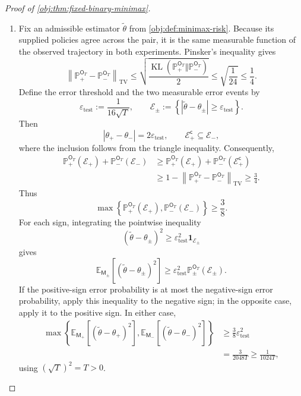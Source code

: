 \begin{proof}[Proof of \cref{obj:thm:fixed-binary-minimax}]
\begin{enumerate}
\item Fix an admissible estimator \(\widetilde\theta\) from
\cref{obj:def:minimax-risk}. Because its supplied policies agree across the pair, it is the same measurable function of the observed trajectory in both experiments. Pinsker's inequality gives
\[
\left\|\mathbb P_+^{\mathsf O_T}
-\mathbb P_-^{\mathsf O_T}\right\|_{\mathrm{TV}}
\leq
\sqrt{\frac{
\operatorname{KL}(\mathbb P_+^{\mathsf O_T}
\Vert\mathbb P_-^{\mathsf O_T})}{2}}
\leq\sqrt{\frac1{24}}\leq\frac14.
\]
Define the error threshold and the two measurable error events by
\[
\varepsilon_{\mathrm{test}}:=\frac1{16\sqrt T},
\qquad
\mathcal E_\pm:=
\left\{|\widetilde\theta-\theta_\pm|
\geq\varepsilon_{\mathrm{test}}\right\}.
\]
Then
\[
|\theta_+-\theta_-|=2\varepsilon_{\mathrm{test}},
\qquad
\mathcal E_+^{\mathsf c}\subseteq\mathcal E_-,
\]
where the inclusion follows from the triangle inequality. Consequently,
\[
\begin{aligned}
\mathbb P_+^{\mathsf O_T}(\mathcal E_+)
+\mathbb P_-^{\mathsf O_T}(\mathcal E_-)
&\geq
\mathbb P_+^{\mathsf O_T}(\mathcal E_+)
+\mathbb P_-^{\mathsf O_T}(\mathcal E_+^{\mathsf c})\\
&\geq
1-\left\|\mathbb P_+^{\mathsf O_T}
-\mathbb P_-^{\mathsf O_T}\right\|_{\mathrm{TV}}
\geq\frac34.
\end{aligned}
\]
Thus
\[
\max\left\{
\mathbb P_+^{\mathsf O_T}(\mathcal E_+),
\mathbb P_-^{\mathsf O_T}(\mathcal E_-)
\right\}\geq\frac38.
\]
For each sign, integrating the pointwise inequality
\[
(\widetilde\theta-\theta_\pm)^2
\geq\varepsilon_{\mathrm{test}}^2\mathbf1_{\mathcal E_\pm}
\]
gives
\[
\mathbb E_{\mathsf M_\pm}
[(\widetilde\theta-\theta_\pm)^2]
\geq
\varepsilon_{\mathrm{test}}^2
\mathbb P_\pm^{\mathsf O_T}(\mathcal E_\pm).
\]
If the positive-sign error probability is at most the negative-sign error probability, apply this inequality to the negative sign; in the opposite case, apply it to the positive sign. In either case,
\[
\begin{aligned}
\max\left\{
\mathbb E_{\mathsf M_+}[(\widetilde\theta-\theta_+)^2],
\mathbb E_{\mathsf M_-}[(\widetilde\theta-\theta_-)^2]
\right\}
&\geq\frac38\varepsilon_{\mathrm{test}}^2\\
&=\frac3{2048T}
\geq\frac1{1024T},
\end{aligned}
\]
using \((\sqrt T)^2=T>0\).


\end{enumerate}
\end{proof}
